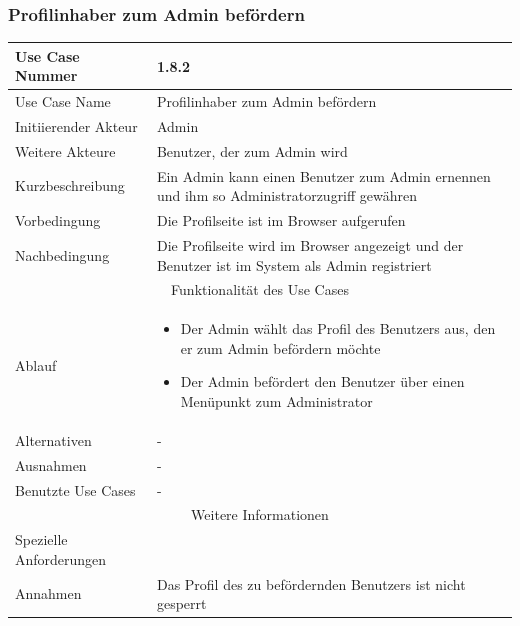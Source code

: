 \documentclass[10pt,a4paper]{article}
\begin{document}
			\subsubsection{Profilinhaber zum Admin bef\"ordern}
		\begin{tabularx}{\textwidth}{|l|X|}
		\hline Use Case Nummer & 1.8.2 \\ 
		\hline Use Case Name & Profilinhaber zum Admin bef\"ordern \\ 
		\hline Initiierender Akteur & Admin \\
		\hline Weitere Akteure & Benutzer, der zum Admin wird \\
		\hline Kurzbeschreibung & Ein Admin kann einen Benutzer zum Admin ernennen und ihm so Administratorzugriff gew\"ahren \\
		\hline Vorbedingung & Die Profilseite ist im Browser aufgerufen \\
		\hline Nachbedingung & Die Profilseite wird im Browser angezeigt und der Benutzer ist im System als Admin registriert \\
		\hline \multicolumn{2}{|c|}{Funktionalität des Use Cases}\\
		\hline  Ablauf & \begin{itemize}
					\item Der Admin w\"ahlt das Profil des Benutzers aus, den er zum Admin bef\"ordern m\"ochte
					\item Der Admin bef\"ordert den Benutzer \"uber einen Men\"upunkt zum Administrator
				\end{itemize}\\
		\hline Alternativen & - \\
		\hline Ausnahmen & - \\
		\hline Benutzte Use Cases & - \\
		\hline \multicolumn{2}{|c|}{Weitere Informationen} \\
		\hline Spezielle Anforderungen &  \\
		\hline Annahmen & Das Profil des zu bef\"ordernden Benutzers ist nicht gesperrt \\
		\hline
		\end{tabularx}
		
\end{document}
